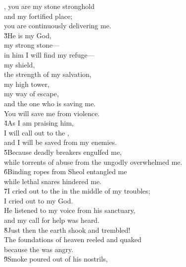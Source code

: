\begin{poetry}
\poeml {}, you are my stone stronghold \\
\poemll    and my fortified place; \\
\poemlll       you are continuously delivering me. \\
\poeml \v{3}He is my God, \\
\poemll    my strong stone--- \\
\poemlll       in him I will find my refuge--- \\
\poeml my shield, \\
\poemll    the strength of my salvation, \\
\poemlll       my high tower, \\
\poeml my way of escape, \\
\poemll    and the one who is saving me. \\
\poemlll       You will save me from violence. \\
\poeml \v{4}As I am praising him, \\
\poemll    I will call out to the , \\
\poemlll       and I will be saved from my enemies. \\
\poeml \v{5}Because deadly breakers engulfed me, \\
\poemll    while torrents of abuse from the ungodly overwhelmed me. \\
\poeml \v{6}Binding ropes from Sheol entangled me \\
\poemll    while lethal snares hindered me. \\
\poeml \v{7}I cried out to the  in the middle of my troubles; \\
\poemll    I cried out to my God. \\
\poeml He listened to my voice from his sanctuary, \\
\poemll    and my call for help was heard. \\
\poeml \v{8}Just then the earth shook and trembled! \\
\poemll    The foundations of heaven reeled and quaked \\
\poemlll       because the  was angry. \\
\poeml \v{9}Smoke poured out of his nostrils, \\

\end{poetry}
